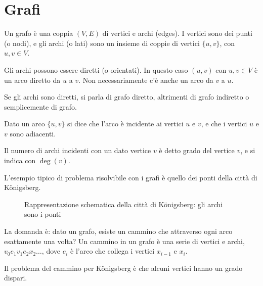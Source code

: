 \section{Grafi}

Un grafo \`e una coppia $(V,E)$ di vertici e archi (edges). I vertici sono dei punti (o nodi), e gli archi (o lati) sono un insieme di coppie di vertici $\{u, v\}$, con $u, v \in V$.

Gli archi possono essere diretti (o orientati). In questo caso $(u,v)$ con $u,v \in V$ \`e un arco diretto da $u$ a $v$. Non necessariamente c'\`e anche un arco da $v$ a $u$.

Se gli archi sono diretti, si parla di grafo diretto, altrimenti di grafo indiretto o semplicemente di grafo.

Dato un arco $\{u,v\}$ si dice che l'arco \`e incidente ai vertici $u$ e $v$, e che i vertici $u$ e $v$ sono adiacenti.

Il numero di archi incidenti con un dato vertice $v$ \`e detto grado del vertice $v$, e si indica con $\deg (v)$.

L'esempio tipico di problema risolvibile con i grafi \`e quello dei ponti della citt\`a di K\"{o}nigsberg. 

\begin{figure}
\centering
\caption{Rappresentazione schematica della citt\`a di K\"{o}nigsberg: gli archi sono i ponti}
\end{figure}

La domanda \`e: dato un grafo, esiste un cammino che attraverso ogni arco esattamente una volta? Un cammino in un grafo \`e una serie di vertici e archi, $v_0 e_1 v_1 e_2 x_2 \dots$, dove $e_i$ \`e l'arco che collega i vertici $x_{i - 1}$ e $x_{i}$.

Il problema del cammino per K\"{o}nigsberg \`e che alcuni vertici hanno un grado dispari.

